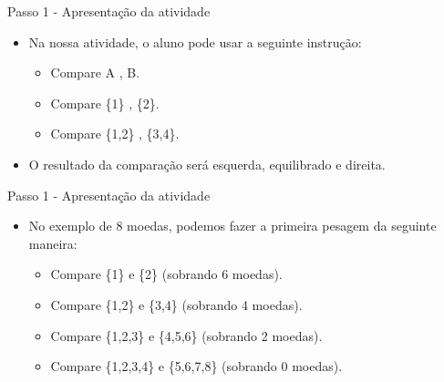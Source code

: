 \documentclass{beamer}
\begin{document}




\begin{frame}{Passo 1 - Apresentação da atividade}

\begin{itemize}
    \item Na nossa atividade, o aluno pode usar a seguinte instrução:
    
    \begin{itemize}
        \item Compare A , B.
        \item Compare \{1\} , \{2\}.
        \item Compare \{1,2\} , \{3,4\}.
    \end{itemize}
    
    \item O resultado da comparação será esquerda, equilibrado e direita.
\end{itemize}

\end{frame}

\begin{frame}{Passo 1 - Apresentação da atividade}

\begin{itemize}
    \item No exemplo de 8 moedas, podemos fazer a primeira pesagem da seguinte maneira:
    
    \begin{itemize}
        \item Compare \{1\} e \{2\} (sobrando 6 moedas).
        \item Compare \{1,2\} e \{3,4\} (sobrando 4 moedas).
        \item Compare \{1,2,3\} e \{4,5,6\} (sobrando 2 moedas).
        \item Compare \{1,2,3,4\} e \{5,6,7,8\} (sobrando 0 moedas).
    \end{itemize}
\end{itemize}

\end{frame}
\end{document}
